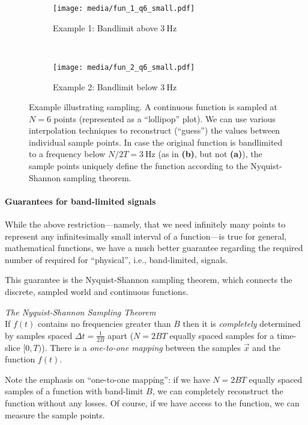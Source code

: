 \documentclass[10pt,letterpaper,oneside]{article}
\begin{document}
\begin{figure}
	\begin{subfigure}{\textwidth}
		\centering
		\texttt{[image: media/fun\_1\_q6\_small.pdf]}
		\caption{Example 1: Bandlimit above $\SI{3}{\hertz}$}
	\end{subfigure}\\[0.5cm]
	\begin{subfigure}{\textwidth}
		\centering
		\texttt{[image: media/fun\_2\_q6\_small.pdf]}
		\caption{Example 2: Bandlimit below $\SI{3}{\hertz}$}
	\end{subfigure}		
	\caption{Example illustrating sampling. A continuous function is sampled at $N = 6$ points (represented as a \enquote{lollipop} plot). We can use various interpolation techniques to reconstruct (\enquote{guess}) the values between individual sample points. In case the original function is bandlimited to a frequency below $N / {2T} = \SI{3}{\hertz}$ (as in \textbf{(b)}, but not \textbf{(a)}), the sample points uniquely define the function according to the Nyquist-Shannon sampling theorem.}
	\label{fig:sampling}
\end{figure}



\newpage

\paragraph{Guarantees for band-limited signals}
While the above restriction---namely, that we need infinitely many points to represent any infinitesimally small interval of a function---is true for general, mathematical functions, we have a much better guarantee regarding the required number of required for \enquote{physical}, i.e., band-limited, signals.

This guarantee is the Nyquist-Shannon sampling theorem, which connects the discrete, sampled world and continuous functions.
\begin{mdframed}
	\emph{The Nyquist-Shannon Sampling Theorem}\\
	If $f(t)$ contains no frequencies greater than $B$ then it is \emph{completely} determined by samples spaced $\Delta t = \frac{1}{2B}$ apart ($N = 2BT$ equally spaced samples for a time-slice $[0, T)$). There is a \emph{one-to-one mapping} between the samples $\vec x$ and the function $f(t)$.
\end{mdframed}
Note the emphasis on \enquote{one-to-one mapping}: if we have $N = 2BT$ equally spaced samples of a function with band-limit $B$, we can completely reconstruct the function without any losses. Of course, if we have access to the function, we can measure the sample points.
\end{document}
